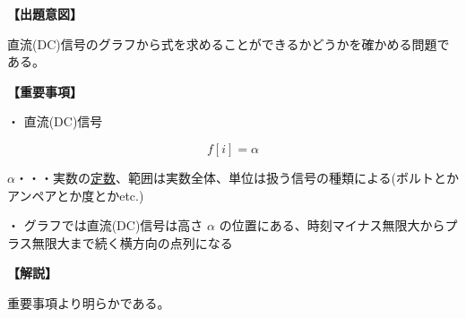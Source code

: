 \noindent \textbf{【出題意図】}

\noindent 直流(DC)信号のグラフから式を求めることができるかどうかを確かめる問題である。

\vspace{1em}
\noindent \textbf{【重要事項】}

\medskip
\noindent・ 直流(DC)信号

\[
f[i] = \alpha
\]

\bigskip
\noindent $\alpha$・・・実数の\underline{定数}、範囲は実数全体、単位は扱う信号の種類による(ボルトとかアンペアとか度とかetc.)

\bigskip
\noindent・ グラフでは直流(DC)信号は高さ $\alpha$ の位置にある、時刻マイナス無限大からプラス無限大まで続く横方向の点列になる

\vspace{1em}
\noindent \textbf{【解説】}

\noindent 重要事項より明らかである。
